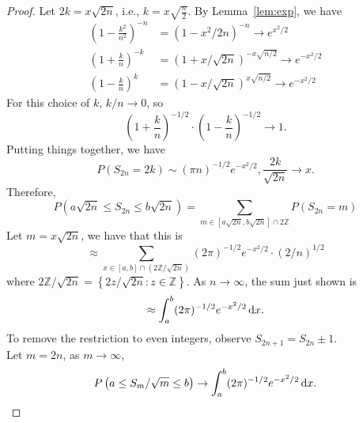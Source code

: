 \begin{proof}
	Let \(2k=x\sqrt{2n}\), i.e., \(k=x\sqrt{\frac{n}{2}}\). By Lemma~\ref{lem:exp}, we have
	\begin{equation*}
		\begin{aligned}
			\left(1-\frac{k^{2}}{n^{2}}\right)^{-n} & =\left(1-x^{2} / 2 n\right)^{-n} \rightarrow e^{x^{2} / 2}       \\
			\left(1+\frac{k}{n}\right)^{-k}         & =(1+x / \sqrt{2 n})^{-x \sqrt{n / 2}} \rightarrow e^{-x^{2} / 2} \\
			\left(1-\frac{k}{n}\right)^{k}          & =(1-x / \sqrt{2 n})^{x \sqrt{n / 2}} \rightarrow e^{-x^{2} / 2}
		\end{aligned}
	\end{equation*}
	For this choice of \(k\), \(k/n \rightarrow 0\), so
	\begin{equation*}
		\left(1+\frac{k}{n}\right)^{-1 / 2} \cdot\left(1-\frac{k}{n}\right)^{-1 / 2} \rightarrow 1.
	\end{equation*}
	Putting things together, we have
	\begin{equation*}
		P\left(S_{2 n}=2 k\right) \sim (\pi n)^{-1 / 2} e^{-x^{2} / 2},\frac{2k}{\sqrt{2n}} \rightarrow x.
	\end{equation*}
	Therefore,
	\begin{equation*}
		P\left( a\sqrt{2n} \leq S_{2 n} \leq b\sqrt{2 n} \right) = \sum_{m \in \left[a\sqrt{2 n},b\sqrt{2 n}\right] \cap 2\mathbb{Z}} P\left(S_{2 n}=m\right)
	\end{equation*}
	Let \(m=x\sqrt{2 n}\), we have that this is
	\begin{equation*}
		\approx \sum_{x \in \left[a,b\right] \cap \left(2\mathbb{Z} / \sqrt{2 n}\right)}(2 \pi)^{-1 / 2} e^{-x^{2} / 2}\cdot(2/n)^{1/2}
	\end{equation*}
	where \(2\mathbb{Z} / \sqrt{2 n} = \left\{2z/\sqrt{2n} : z\in\mathbb{Z}\right\}\). As \(n\rightarrow\infty\), the sum just shown is
	\begin{equation*}
		\approx \int_{a}^{b}(2 \pi)^{-1 / 2} e^{-x^{2} / 2} \mathop{}\!\mathrm{d} x.
	\end{equation*}
	To remove the restriction to even integers, observe \(S_{2 n +1}=S_{2 n} \pm 1\).\\
	Let \(m=2n\), as \(m\rightarrow\infty\),
	\begin{equation*}
		P\left(a \leq S_{m} / \sqrt{m} \leq b\right) \rightarrow \int_{a}^{b}(2 \pi)^{-1 / 2} e^{-x^{2} / 2} \mathop{}\!\mathrm{d} x.
	\end{equation*}
\end{proof}

